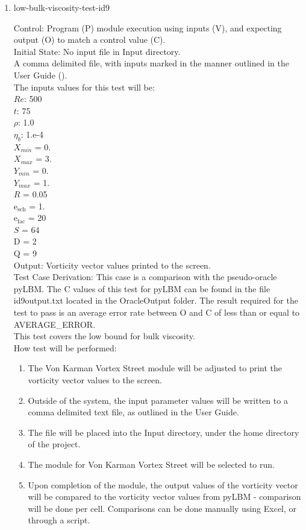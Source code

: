 \documentclass[12pt, titlepage]{article}
\begin{document}
\begin{enumerate}
\item{low-bulk-viscosity-test-id9\\}

Control: Program (P) module execution using inputs (V), and expecting output (O) to match a control value (C).\\
					
Initial State: No input file in Input directory.\\
					
A comma delimited file, with inputs marked in the manner outlined in the User Guide (\citet{LBM_UserGuide_PM}).\\The inputs values for this test will be:\\
$Re$: 500\\
$t$: 75\\
$\rho$: 1.0\\
$\eta_b$: 1.e-4\\
$X_{min}$ = 0.\\
$X_{max}$ = 3.\\
$Y_{min}$ = 0.\\
$Y_{max}$ = 1.\\
$R$ = 0.05\\
$\mathrm{e_{sch}}$ = 1.\\
$\mathrm{e_{fac}}$ = 20\\
$S$ = 64\\
$\mathrm{D}$ = 2\\
$\mathrm{Q}$ = 9\\

Output: Vorticity vector values printed to the screen.  \\

Test Case Derivation: This case is a comparison with the pseudo-oracle pyLBM. The C values of this test for pyLBM can be found in the file id9output.txt located in the OracleOutput folder. The result required for the test to pass is an average error rate between O and C of less than or equal to AVERAGE\_ERROR.\\
This test covers the low bound for bulk viscosity.\\

					
How test will be performed: 

\begin{enumerate}
\item The Von Karman Vortex Street module will be adjusted to print the vorticity vector values to the screen.
\item Outside of the system, the input parameter values will be written to a comma delimited text file, as outlined in the User Guide.
\item The file will be placed into the Input directory, under the home directory of the project.
\item The module for Von Karman Vortex Street will be selected to run.
\item Upon completion of the module, the output values of the vorticity vector will be compared to the vorticity vector values from pyLBM - comparison will be done per cell. Comparisons can be done manually using Excel, or through a script.\\
\end{enumerate}


\end{enumerate}
\end{document}
